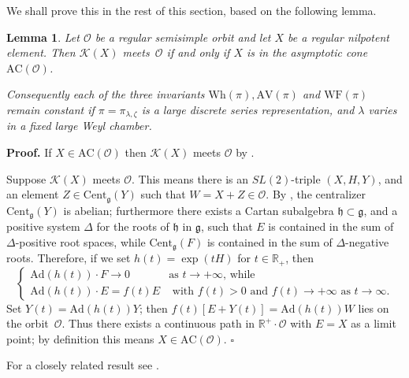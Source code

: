 \documentclass[10pt,leqno]{article}
\newtheorem{lemma}[equation]{Lemma}
\numberwithin{equation}{section}
\newcommand{\qed}{\hfill $\square$ \medskip}
\newenvironment{proof}[1][Proof]{\noindent\textbf{#1.} }{\qed}
\newcommand{\Ad}{\mathrm{Ad}}
\newcommand{\Cent}{\mathrm{Cent}}
\renewcommand{\O}{\mathcal O}
\newcommand{\R}{\mathbb R}
\newcommand{\g}{\mathfrak g}
\newcommand{\AV}{\mathrm{AV}}
\newcommand{\Wh}{\mathrm{Wh}}
\newcommand{\WF}{\mathrm{WF}}
\newcommand{\AC}{\mathrm{AC}}
\newcommand{\Kostant}[1]{\mathcal{K}(#1)}
\begin{document}
We shall prove this in the rest of this section, based on the following lemma.

\begin{lemma}\label{lem:Kost_and_AC} Let $\mathcal{O}$ be a regular semisimple orbit and  let $X$ be a regular nilpotent element. Then $\Kostant{X}$ meets~$\mathcal{O}$ if and only if $X$ is in the asymptotic cone~$\AC(\mathcal{O})$. 

Consequently each of the three invariants $\Wh(\pi),\AV(\pi)$ and $\WF(\pi)$ remain constant if $\pi=\pi_{\lambda, \zeta}$ is a large discrete series representation, and $\lambda$ varies in a fixed large Weyl chamber.
\end{lemma}
\begin{proof} 
If $X\in \AC(\mathcal O)$ then $\Kostant{X}$ meets $\mathcal O$ by \cite[Lemma 3.2.3]{adams_kaletha}.

Suppose $\Kostant{X}$ meets $\mathcal O$.
This means there is an $SL(2)$-triple $(X,H,Y)$, and an element $Z\in \Cent_\g(Y)$ such that $W=X+Z \in \O$. 
By \cite{Kostant59}, the centralizer  $\mathrm{Cent}_{\g}(Y)$ is abelian; furthermore there exists a Cartan subalgebra $\mathfrak{h} \subset \g$, and a positive system $\Delta$ for the roots of $\mathfrak{h}$ in $\g$, such that $E$ is contained in the sum of $\Delta$-positive root spaces, while $\mathrm{Cent}_{\g}(F)$ is contained in the sum of $\Delta$-negative roots.  Therefore, if we set $h(t) = \exp(tH)$ for $t \in \R_+$, then 
\[\begin{cases} \mathrm{Ad}(h(t)) \cdot F \longrightarrow 0 & \text{as $t \to +\infty$, while} \\
 \mathrm{Ad}(h(t)) \cdot E = f(t) E & \text{ with $f(t) >0$ and $f(t)\to +\infty$ as $t \to \infty$.}\end{cases}\]
Set $Y(t) = \mathrm{Ad}(h(t)) Y$; then $f(t) \left[ E + Y(t) \right] = \mathrm{Ad}(h(t)) W$ lies on the orbit~$\mathcal{O}$. Thus there exists a continuous path in $\R^+ \cdot \mathcal{O}$ with $E=X$ as a limit point; by definition this means $X \in \AC(\mathcal{O})$.%
\end{proof}

For a closely related result see \cite[Proposition 3.5]{fm}.
\end{document}
